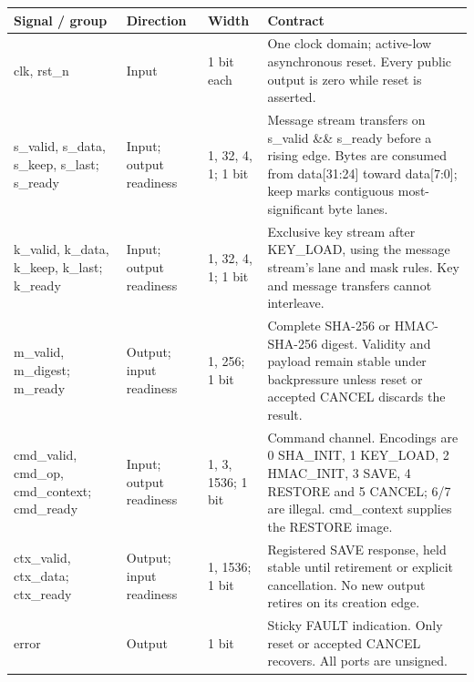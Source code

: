 \documentclass[11pt,a4paper]{article}
\begin{document}
{\small\renewcommand{\arraystretch}{1.18}\begin{longtable}{@{}L{0.21\textwidth}|L{0.12\textwidth}|L{0.12\textwidth}|L{0.45\textwidth}@{}}\toprule

\textbf{Signal /\allowbreak{} group} & \textbf{Direction} & \textbf{Width} & \textbf{Contract}\\\midrule\endhead

clk,\allowbreak{} rst\_\allowbreak{}n & Input & 1 bit each & One clock domain; active-low asynchronous reset. Every public output is zero while reset is asserted.\\[2pt]\hline

s\_\allowbreak{}valid,\allowbreak{} s\_\allowbreak{}data,\allowbreak{} s\_\allowbreak{}keep,\allowbreak{} s\_\allowbreak{}last; s\_\allowbreak{}ready & Input; output readiness & 1,\allowbreak{} 32,\allowbreak{} 4,\allowbreak{} 1; 1 bit & Message stream transfers on s\_\allowbreak{}valid \&\& s\_\allowbreak{}ready before a rising edge. Bytes are consumed from data[\allowbreak{}31:24]\allowbreak{} toward data[\allowbreak{}7:0]\allowbreak{}; keep marks contiguous most-significant byte lanes.\\[2pt]\hline

k\_\allowbreak{}valid,\allowbreak{} k\_\allowbreak{}data,\allowbreak{} k\_\allowbreak{}keep,\allowbreak{} k\_\allowbreak{}last; k\_\allowbreak{}ready & Input; output readiness & 1,\allowbreak{} 32,\allowbreak{} 4,\allowbreak{} 1; 1 bit & Exclusive key stream after KEY\_\allowbreak{}LOAD,\allowbreak{} using the message stream's lane and mask rules. Key and message transfers cannot interleave.\\[2pt]\hline

m\_\allowbreak{}valid,\allowbreak{} m\_\allowbreak{}digest; m\_\allowbreak{}ready & Output; input readiness & 1,\allowbreak{} 256; 1 bit & Complete SHA-256 or HMAC-SHA-256 digest. Validity and payload remain stable under backpressure unless reset or accepted CANCEL discards the result.\\[2pt]\hline

cmd\_\allowbreak{}valid,\allowbreak{} cmd\_\allowbreak{}op,\allowbreak{} cmd\_\allowbreak{}context; cmd\_\allowbreak{}ready & Input; output readiness & 1,\allowbreak{} 3,\allowbreak{} 1536; 1 bit & Command channel. Encodings are 0 SHA\_\allowbreak{}INIT,\allowbreak{} 1 KEY\_\allowbreak{}LOAD,\allowbreak{} 2 HMAC\_\allowbreak{}INIT,\allowbreak{} 3 SAVE,\allowbreak{} 4 RESTORE and 5 CANCEL; 6/\allowbreak{}7 are illegal. cmd\_\allowbreak{}context supplies the RESTORE image.\\[2pt]\hline

ctx\_\allowbreak{}valid,\allowbreak{} ctx\_\allowbreak{}data; ctx\_\allowbreak{}ready & Output; input readiness & 1,\allowbreak{} 1536; 1 bit & Registered SAVE response,\allowbreak{} held stable until retirement or explicit cancellation. No new output retires on its creation edge.\\[2pt]\hline

error & Output & 1 bit & Sticky FAULT indication. Only reset or accepted CANCEL recovers. All ports are unsigned.\\[2pt]\hline

\bottomrule\end{longtable}}
\end{document}
